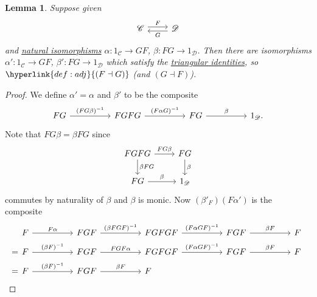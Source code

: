 \documentclass{article}
\newtheorem{nlemma}[nthm]{Lemma}
\begin{document}
\begin{nlemma}\label{lem:3.8}
  Suppose given
  \begin{equation*}
    \begin{tikzcd}
      \mathscr{C} \rar[shift left]{F} & \mathscr{D} \lar[shift left]{G}
    \end{tikzcd}
  \end{equation*}
  and \hyperlink{def:natiso}{natural isomorphisms} $\alpha: 1_{\mathscr{C}} \to GF$, $\beta: FG \to 1_{\mathscr{D}}$.
  Then there are isomorphisms $\alpha': 1_{\mathscr{C}} \to GF$, $\beta': FG \to 1_{\mathscr{D}}$ which satisfy the \hyperlink{def:triId}{triangular identities}, so $\hyperlink{def:adj}{(F \dashv G)}$ (and $(G \dashv F)$).
\end{nlemma}
\begin{proof}
  We define $\alpha' = \alpha$ and $\beta'$ to be the composite
  \begin{equation*}
    \begin{tikzcd}[column sep=huge]
      FG \rar{(FG\beta)^{-1}} & FGFG \rar{(F\alpha G)^{-1}} & FG \rar{\beta} & 1_{\mathscr{D}}.
    \end{tikzcd}
  \end{equation*}
  Note that $FG\beta = \beta{FG}$ since
  \begin{equation*}
    \begin{tikzcd}
      FGFG \rar{FG\beta} \dar{\beta{FG}} & FG \dar{\beta} \\
      FG \rar{\beta} & 1_{\mathscr{D}}
    \end{tikzcd}
  \end{equation*}
  commutes by naturality of $\beta$ and $\beta$ is monic.
  Now $(\beta'_F)(F\alpha')$ is the composite
  \begin{align*}
    &\begin{tikzcd}[ampersand replacement=\&, column sep=huge]
      F \rar{F\alpha} \& FGF \rar{(\beta {FGF})^{-1}} \& FGFGF \rar{(F\alpha{GF})^{-1}} \& FGF \rar{\beta F} \& F
    \end{tikzcd} \\
    =
    &\begin{tikzcd}[ampersand replacement=\&, column sep=huge]
      F \rar{(\beta F)^{-1}} \& FGF \rar{FGF\alpha} \& FGFGF \rar{(F\alpha{GF})^{-1}} \& FGF \rar{\beta F} \& F
    \end{tikzcd} \\
    =
    &\begin{tikzcd}[ampersand replacement=\&, column sep=huge]
      F \rar{(\beta F)^{-1}} \& FGF \rar{\beta F} \& F

\end{tikzcd}
\end{align*}
\end{proof}
\end{document}
